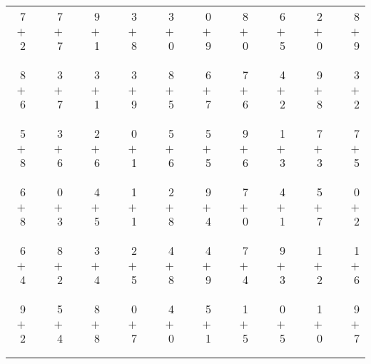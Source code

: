 \documentclass[12pt, letterpaper]{article}
\begin{document}
\begin{tabular}{rrrrrrrrrrrrrrrrrrr}
7 & & 7 & & 9 & & 3 & & 3 & & 0 & & 8 & & 6 & & 2 & & 8\\
$+$ 2 & & $+$ 7 & & $+$ 1 & & $+$ 8 & & $+$ 0 & & $+$ 9 & & $+$ 0 & & $+$ 5 & & $+$ 0 & & $+$ 9\\
\cline{1-1} \cline{3-3} \cline{5-5} \cline{7-7} \cline{9-9} \cline{11-11} \cline{13-13} \cline{15-15} \cline{17-17} \cline{19-19} \\ \\
8 & & 3 & & 3 & & 3 & & 8 & & 6 & & 7 & & 4 & & 9 & & 3\\
$+$ 6 & & $+$ 7 & & $+$ 1 & & $+$ 9 & & $+$ 5 & & $+$ 7 & & $+$ 6 & & $+$ 2 & & $+$ 8 & & $+$ 2\\
\cline{1-1} \cline{3-3} \cline{5-5} \cline{7-7} \cline{9-9} \cline{11-11} \cline{13-13} \cline{15-15} \cline{17-17} \cline{19-19} \\ \\
5 & & 3 & & 2 & & 0 & & 5 & & 5 & & 9 & & 1 & & 7 & & 7\\
$+$ 8 & & $+$ 6 & & $+$ 6 & & $+$ 1 & & $+$ 6 & & $+$ 5 & & $+$ 6 & & $+$ 3 & & $+$ 3 & & $+$ 5\\
\cline{1-1} \cline{3-3} \cline{5-5} \cline{7-7} \cline{9-9} \cline{11-11} \cline{13-13} \cline{15-15} \cline{17-17} \cline{19-19} \\ \\
6 & & 0 & & 4 & & 1 & & 2 & & 9 & & 7 & & 4 & & 5 & & 0\\
$+$ 8 & & $+$ 3 & & $+$ 5 & & $+$ 1 & & $+$ 8 & & $+$ 4 & & $+$ 0 & & $+$ 1 & & $+$ 7 & & $+$ 2\\
\cline{1-1} \cline{3-3} \cline{5-5} \cline{7-7} \cline{9-9} \cline{11-11} \cline{13-13} \cline{15-15} \cline{17-17} \cline{19-19} \\ \\
6 & & 8 & & 3 & & 2 & & 4 & & 4 & & 7 & & 9 & & 1 & & 1\\
$+$ 4 & & $+$ 2 & & $+$ 4 & & $+$ 5 & & $+$ 8 & & $+$ 9 & & $+$ 4 & & $+$ 3 & & $+$ 2 & & $+$ 6\\
\cline{1-1} \cline{3-3} \cline{5-5} \cline{7-7} \cline{9-9} \cline{11-11} \cline{13-13} \cline{15-15} \cline{17-17} \cline{19-19} \\ \\
9 & & 5 & & 8 & & 0 & & 4 & & 5 & & 1 & & 0 & & 1 & & 9\\
$+$ 2 & & $+$ 4 & & $+$ 8 & & $+$ 7 & & $+$ 0 & & $+$ 1 & & $+$ 5 & & $+$ 5 & & $+$ 0 & & $+$ 7\\
\cline{1-1} \cline{3-3} \cline{5-5} \cline{7-7} \cline{9-9} \cline{11-11} \cline{13-13} \cline{15-15} \cline{17-17} \cline{19-19} \\ \\

\end{tabular}
\end{document}
